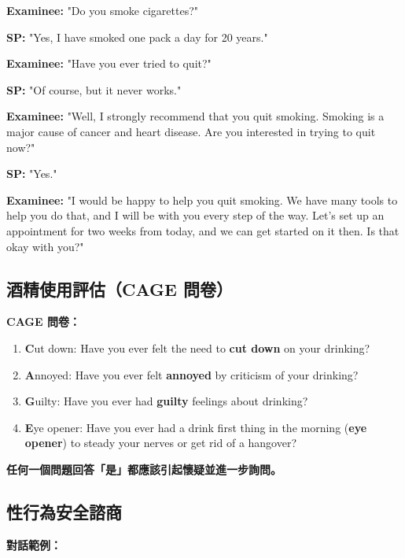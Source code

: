 \documentclass[12pt,a4paper]{article}
\begin{document}
\begin{tcolorbox}[colback=emergency_blue!5!white,colframe=emergency_blue]
\textbf{Examinee:} "Do you smoke cigarettes?"

\textbf{SP:} "Yes, I have smoked one pack a day for 20 years."

\textbf{Examinee:} "Have you ever tried to quit?"

\textbf{SP:} "Of course, but it never works."

\textbf{Examinee:} "Well, I strongly recommend that you quit smoking. Smoking is a major cause of cancer and heart disease. Are you interested in trying to quit now?"

\textbf{SP:} "Yes."

\textbf{Examinee:} "I would be happy to help you quit smoking. We have many tools to help you do that, and I will be with you every step of the way. Let's set up an appointment for two weeks from today, and we can get started on it then. Is that okay with you?"
\end{tcolorbox}

\subsection{酒精使用評估（CAGE 問卷）}

\begin{importantbox}
\textbf{CAGE 問卷：}
\begin{enumerate}
    \item \textbf{C}ut down: Have you ever felt the need to \textbf{cut down} on your drinking?
    \item \textbf{A}nnoyed: Have you ever felt \textbf{annoyed} by criticism of your drinking?
    \item \textbf{G}uilty: Have you ever had \textbf{guilty} feelings about drinking?
    \item \textbf{E}ye opener: Have you ever had a drink first thing in the morning (\textbf{eye opener}) to steady your nerves or get rid of a hangover?
\end{enumerate}

\textbf{任何一個問題回答「是」都應該引起懷疑並進一步詢問。}
\end{importantbox}

\subsection{性行為安全諮商}

\textbf{對話範例：}
\end{document}
